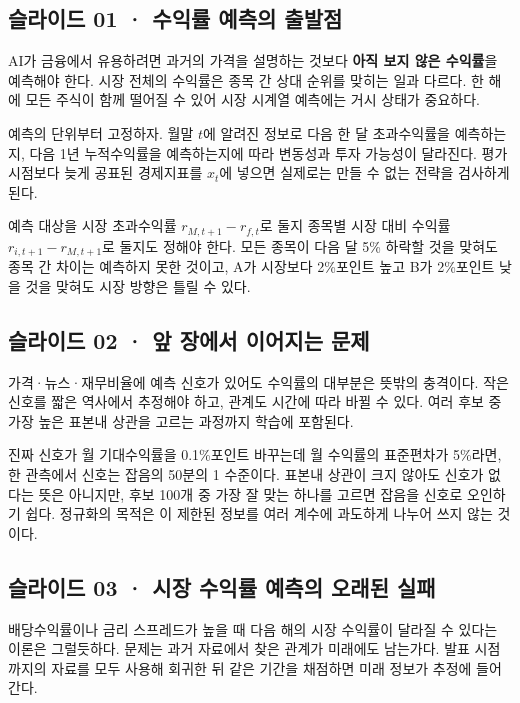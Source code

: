 \documentclass[11pt,a4paper]{article}
\begin{document}
\subsection{슬라이드 01 · 수익률 예측의 출발점}
AI가 금융에서 유용하려면 과거의 가격을 설명하는 것보다 \textbf{아직 보지 않은 수익률}을 예측해야 한다. 시장 전체의 수익률은 종목 간 상대 순위를 맞히는 일과 다르다. 한 해에 모든 주식이 함께 떨어질 수 있어 시장 시계열 예측에는 거시 상태가 중요하다.\par

예측의 단위부터 고정하자. 월말 $t$에 알려진 정보로 다음 한 달 초과수익률을 예측하는지, 다음 1년 누적수익률을 예측하는지에 따라 변동성과 투자 가능성이 달라진다. 평가 시점보다 늦게 공표된 경제지표를 $x_t$에 넣으면 실제로는 만들 수 없는 전략을 검사하게 된다.\par

예측 대상을 시장 초과수익률 $r_{M,t+1}-r_{f,t}$로 둘지 종목별 시장 대비 수익률 $r_{i,t+1}-r_{M,t+1}$로 둘지도 정해야 한다. 모든 종목이 다음 달 5\% 하락할 것을 맞혀도 종목 간 차이는 예측하지 못한 것이고, A가 시장보다 2\%포인트 높고 B가 2\%포인트 낮을 것을 맞혀도 시장 방향은 틀릴 수 있다.\par

\subsection{슬라이드 02 · 앞 장에서 이어지는 문제}
가격·뉴스·재무비율에 예측 신호가 있어도 수익률의 대부분은 뜻밖의 충격이다. 작은 신호를 짧은 역사에서 추정해야 하고, 관계도 시간에 따라 바뀔 수 있다. 여러 후보 중 가장 높은 표본내 상관을 고르는 과정까지 학습에 포함된다.\par

진짜 신호가 월 기대수익률을 0.1\%포인트 바꾸는데 월 수익률의 표준편차가 5\%라면, 한 관측에서 신호는 잡음의 50분의 1 수준이다. 표본내 상관이 크지 않아도 신호가 없다는 뜻은 아니지만, 후보 100개 중 가장 잘 맞는 하나를 고르면 잡음을 신호로 오인하기 쉽다. 정규화의 목적은 이 제한된 정보를 여러 계수에 과도하게 나누어 쓰지 않는 것이다.\par

\subsection{슬라이드 03 · 시장 수익률 예측의 오래된 실패}
배당수익률이나 금리 스프레드가 높을 때 다음 해의 시장 수익률이 달라질 수 있다는 이론은 그럴듯하다. 문제는 과거 자료에서 찾은 관계가 미래에도 남는가다. 발표 시점까지의 자료를 모두 사용해 회귀한 뒤 같은 기간을 채점하면 미래 정보가 추정에 들어간다.\par
\end{document}
